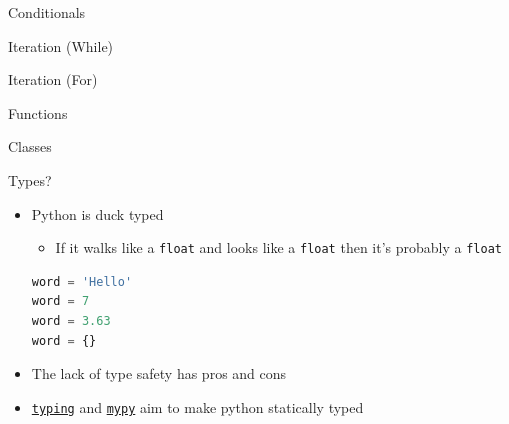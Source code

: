 \documentclass[aspectratio=169,xcolor=dvipsnames]{beamer}
\begin{document}
\begin{frame}{Conditionals}
  \begin{example}
    
  \end{example}
\end{frame}


\begin{frame}{Iteration (While)}
  \begin{example}
    
  \end{example}
\end{frame}


\begin{frame}{Iteration (For)}
  \begin{example}
    
  \end{example}
\end{frame}


\begin{frame}{Functions}
  \begin{example}
    
  \end{example}
\end{frame}


\begin{frame}{Classes}
  \begin{example}
    
  \end{example}
\end{frame}


\begin{frame}[fragile]{Types?}
  \begin{itemize}
    \item Python is duck typed
    \begin{itemize}
        \item If it walks like a \texttt{float} and looks like a \texttt{float} then it's probably a \texttt{float}
    \end{itemize}
    \begin{example}
        \begin{lstlisting}[language=Python]
word = 'Hello'
word = 7
word = 3.63
word = {}
        \end{lstlisting}
    \end{example}
    \item The lack of type safety has pros and cons
    \item \href{https://docs.python.org/3/library/typing.html}{\texttt{typing}} and \href{http://mypy-lang.org/}{\texttt{mypy}} aim to make python statically typed
  \end{itemize}
\end{frame}
\end{document}
